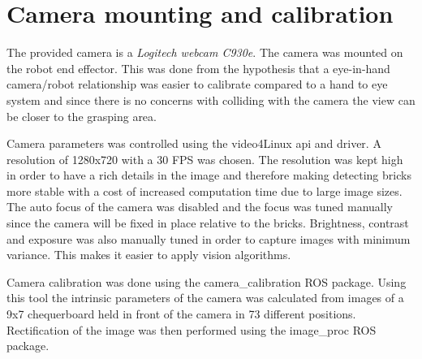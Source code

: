 \section{Camera mounting and calibration}
\label{sec:rc_camera}
The provided camera is a \textit{Logitech webcam C930e}. The camera was mounted on the robot end effector. This was done from the hypothesis that a eye-in-hand camera/robot relationship was easier to calibrate compared to a hand to eye system and since there is no concerns with colliding with the camera the view can be closer to the grasping area.

Camera parameters was controlled using the video4Linux api and driver. A resolution of 1280x720 with a 30 FPS was chosen. The resolution was kept high in order to have a rich details in the image and therefore making detecting bricks more stable with a cost of increased computation time due to large image sizes. 
The auto focus of the camera was disabled and the focus was tuned manually since the camera will be fixed in place relative to the bricks.
Brightness, contrast and exposure was also manually tuned in order to capture images with minimum variance. This makes it easier to apply vision algorithms.

Camera calibration was done using the camera\_calibration ROS package. Using this tool the intrinsic parameters of the camera was calculated from images of a 9x7 chequerboard held in front of the camera in 73 different positions. Rectification of the image was then performed using the image\_proc ROS package.
